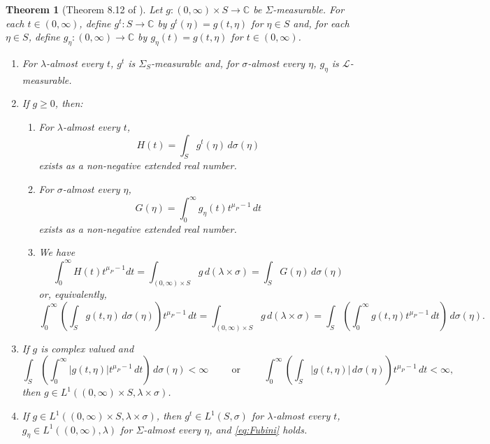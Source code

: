 \documentclass[11pt]{article}
\theoremstyle{theorem}
\newtheorem{theorem}{Theorem}[section]
\begin{document}
\begin{theorem}[Theorem 8.12 of \cite{Rudin1987}]\label{thm:Fubini}
Let $g:(0,\infty)\times S\to\mathbb{C}$ be $\Sigma$-measurable. For each $t\in (0,\infty)$, define $g^t:S\to\mathbb{C}$ by $g^t(\eta)=g(t,\eta)$ for $\eta\in S$ and, for each $\eta\in S$, define $g_\eta:(0,\infty)\to\mathbb{C}$ by $g_\eta(t)=g(t,\eta)$ for $t\in (0,\infty)$. 
\begin{enumerate}
\item For $\lambda$-almost every $t$, $g^t$ is $\Sigma_S$-measurable and, for $\sigma$-almost every $\eta$, $g_\eta$ is $\mathcal{L}$-measurable.
\item\label{item:Fubini1} If $g\geq 0$, then:
\begin{enumerate}
\item For $\lambda$-almost every $t$, 
\begin{equation*}
H(t)=\int_S g^t(\eta)\,d\sigma(\eta)
\end{equation*}
exists as a non-negative extended real number. 
\item For $\sigma$-almost every $\eta$,
\begin{equation*}
G(\eta)=\int_0^\infty g_\eta(t)t^{\mu_P-1}\,dt
\end{equation*}
exists as a non-negative extended real number. 
\item We have
\begin{equation*}
\int_0^\infty H(t)t^{\mu_P-1}dt=\int_{(0,\infty)\times S}g\,d(\lambda\times\sigma)=\int_S G(\eta)\,d\sigma(\eta)
\end{equation*}
or, equivalently,
\begin{equation}\label{eq:Fubini}
\int_0^\infty\left(\int_S g(t,\eta)\,d\sigma(\eta)\right)t^{\mu_P-1}\,dt=\int_{(0,\infty)\times S}g\,d(\lambda\times\sigma)=\int_S\left(\int_0^\infty g(t,\eta)t^{\mu_P-1}\,dt\right)\,d\sigma(\eta).
\end{equation}
\end{enumerate}
\item\label{item:Fubini2} If $g$ is complex valued and
\begin{equation*}
\int_S\left(\int_0^\infty |g(t,\eta)|t^{\mu_P-1}\,dt\right)\,d\sigma(\eta)<\infty\hspace{1cm}\mbox{or}\hspace{1cm}\int_0^\infty\left(\int_S|g(t,\eta)|\,d\sigma(\eta)\right)t^{\mu_P-1}\,dt<\infty,
\end{equation*}
then $g\in L^1((0,\infty)\times S,\lambda\times\sigma)$.
\item If $g\in L^1((0,\infty)\times S,\lambda\times\sigma)$, then $g^t\in L^1(S,\sigma)$ for $\lambda$-almost every $t$, $g_\eta\in L^1((0,\infty),\lambda)$ for $\Sigma$-almost every $\eta$, and \eqref{eq:Fubini} holds.
\end{enumerate}
\end{theorem}
\end{document}

